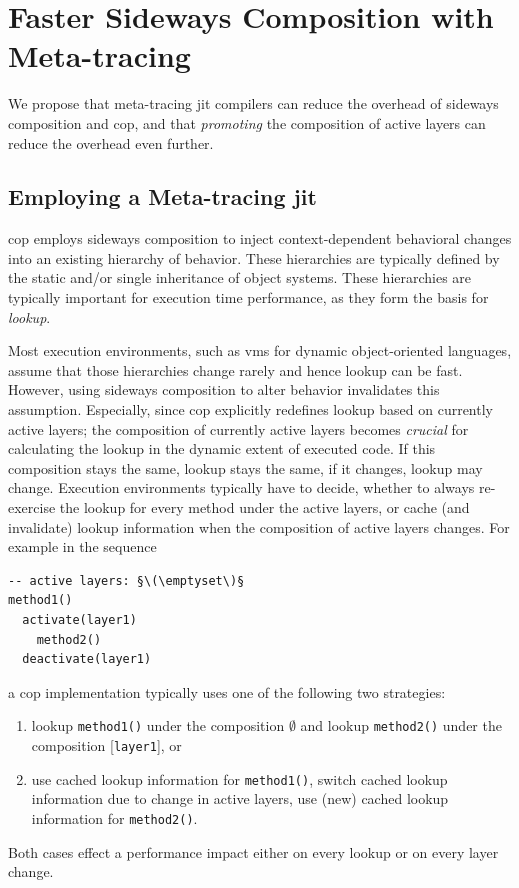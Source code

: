 \documentclass[preprint,english,10pt,nonatbib]{sigplanconf}
\begin{document}
\section{Faster Sideways Composition with Meta-tracing}

We propose that meta-tracing \ac{jit} compilers can reduce the overhead of
sideways composition and \ac{cop}, and that \emph{promoting} the composition of
active layers can reduce the overhead even further.

\subsection{Employing a Meta-tracing \protect\acs{jit}}
\Acl{cop} employs sideways composition to inject context-dependent behavioral
changes into an existing hierarchy of behavior. These hierarchies are typically
defined by the static and/or single inheritance of object systems. These
hierarchies are typically important for execution time performance, as they
form the basis for \emph{lookup}.

Most execution environments, such as \acp{vm} for dynamic object-oriented
languages, assume that those hierarchies change rarely and hence lookup can be
fast. However, using sideways composition to alter behavior invalidates this
assumption. Especially, since \ac{cop} explicitly redefines lookup based on
currently active layers; the composition of currently active layers becomes
\emph{crucial} for calculating the lookup in the dynamic extent of executed
code. If this composition stays the same, lookup stays the same, if it changes,
lookup may change. Execution environments typically have to decide, whether to
always re-exercise the lookup for every method under the active layers, or
cache (and invalidate) lookup information when the composition of active layers
changes. For example in the sequence
\begin{lstlisting}
-- active layers: §\(\emptyset\)§
method1()
  activate(layer1)
    method2()
  deactivate(layer1)
\end{lstlisting}
a \ac{cop} implementation typically uses one of the following two strategies:
\begin{enumerate}
\item lookup \lstinline|method1()| under the composition
  \(\emptyset\)
  and lookup \lstinline|method2()| under the composition
  [\lstinline|layer1|], or
\item use cached lookup information for \lstinline|method1()|, switch cached
  lookup information due to change in active layers, use (new) cached lookup
  information for \lstinline|method2()|.
\end{enumerate}
Both cases effect a performance impact either on every lookup or on every
layer change.
\end{document}

